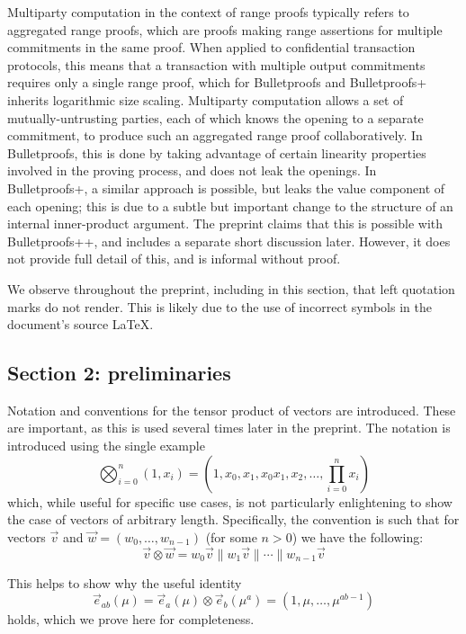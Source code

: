 \documentclass{article}
\begin{document}
Multiparty computation in the context of range proofs typically refers to aggregated range proofs, which are proofs making range assertions for multiple commitments in the same proof.
When applied to confidential transaction protocols, this means that a transaction with multiple output commitments requires only a single range proof, which for Bulletproofs and Bulletproofs+ inherits logarithmic size scaling.
Multiparty computation allows a set of mutually-untrusting parties, each of which knows the opening to a separate commitment, to produce such an aggregated range proof collaboratively.
In Bulletproofs, this is done by taking advantage of certain linearity properties involved in the proving process, and does not leak the openings.
In Bulletproofs+, a similar approach is possible, but leaks the value component of each opening; this is due to a subtle but important change to the structure of an internal inner-product argument.
The preprint claims that this is possible with Bulletproofs++, and includes a separate short discussion later.
However, it does not provide full detail of this, and is informal without proof.

We observe throughout the preprint, including in this section, that left quotation marks do not render.
This is likely due to the use of incorrect symbols in the document's source \LaTeX.


\subsection{Section 2: preliminaries}

Notation and conventions for the tensor product of vectors are introduced.
These are important, as this is used several times later in the preprint.
The notation is introduced using the single example
$$\bigotimes_{i=0}^n (1, x_i) = \left( 1, x_0, x_1, x_0 x_1, x_2, \ldots, \prod_{i=0}^n x_i \right)$$
which, while useful for specific use cases, is not particularly enlightening to show the case of vectors of arbitrary length.
Specifically, the convention is such that for vectors $\vec{v}$ and $\vec{w} = (w_0, \ldots, w_{n-1})$ (for some $n > 0$) we have the following:
$$\vec{v} \otimes \vec{w} = w_0 \vec{v} \| w_1 \vec{v} \| \cdots \| w_{n-1} \vec{v}$$

This helps to show why the useful identity
$$\vec{e}_{ab}(\mu) = \vec{e}_a(\mu) \otimes \vec{e}_b(\mu^a) = (1, \mu, \ldots, \mu^{ab-1})$$
holds, which we prove here for completeness.
\end{document}
